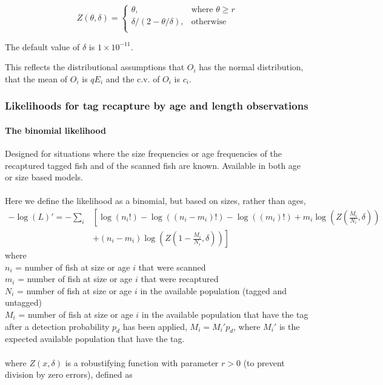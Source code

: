 {{{{\begin{equation}
Z \left(\theta,\delta \right) = \begin{cases}
\theta, & \text{where $\theta \ge r$} \\
\delta/\left( 2-\theta/\delta \right), & \text{otherwise} \\  
\end{cases}
\end{equation}

The default value of $\delta$ is $1 \times 10^{-11}$.

This reflects the distributional assumptions that  $O_i$ has the normal distribution, that the mean of $O_i$ is $qE_i$  and the c.v. of $O_i$ is $c_i$.

\subsubsection{Likelihoods for tag recapture by age and length observations}
\paragraph*{The binomial likelihood}
Designed for situations where the size frequencies or age frequencies of the recaptured tagged fish and of the scanned fish are known. Available in both age or size based models.
\\\\
Here we define the likelihood as a binomial, but based on sizes, rather than ages,
\begin{equation}
\begin{split}
-\log \left(L \right)'= -\sum\limits_i & \left[ \right. \log \left(n_i! \right) - \log \left(\left(n_i - m_i \right)! \right) - \log \left(\left(m_i \right)! \right) + m_i \log \left(Z\left(\frac{M_i}{N_i},\delta \right) \right) \\
&+  \left(n_i - m_i \right)\log \left(Z\left(1 - \frac{M_i}{N_i},\delta\right) \right) \left. \right]
\end{split}
\end{equation}
where 
\\
$n_i$ = number of fish at size or age $i$ that were scanned
\\
$m_i$ = number of fish at size or age $i$ that were recaptured
\\
$N_i$ = number of fish at size or age $i$ in the available population (tagged and untagged)
\\
$M_i$ = number of fish at size or age $i$ in the available population that have the tag after a detection probability $p_d$ has been applied, $M_i = M_i'p_d$, where $M_i'$ is the expected available population that have the tag.
\\\\
where $Z(x,\delta)$ is a robustifying function with parameter $r > 0$ (to prevent division by zero errors), defined as


}}}}

